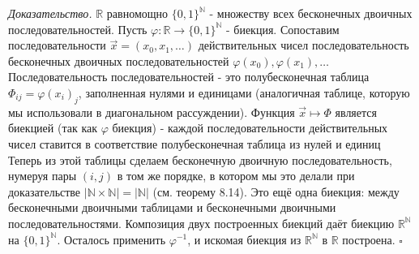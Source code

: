 \documentclass[a4paper]{article}
\newcommand{\qed}{\hfill$\square$}
\begin{document}
\textit{Доказательство.} $\mathbb{R}$ равномощно $\{0,1\}^{\mathbb{N}}$ - множеству всех бесконечных двоичных последовательностей. Пусть $\varphi: \mathbb{R} \rightarrow\{0,1\}^{\mathbb{N}}$ - биекция. Сопоставим последовательности $\vec{x}=\left(x_{0}, x_{1}, \ldots\right)$ действительных чисел последовательность бесконечных двоичных последовательностей $\varphi\left(x_{0}\right), \varphi\left(x_{1}\right), \ldots$\\[2mm]
\indent Последовательность последовательностей - это полубесконечная таблица $\Phi_{i j}=\varphi\left(x_{i}\right)_{j}$, заполненная нулями и единицами (аналогичная таблице, которую мы использовали в диагональном рассуждении). Функция $\vec{x} \mapsto \Phi$ является биекцией (так как $\varphi$ биекция) - каждой последовательности действительных чисел ставится в соответствие полубесконечная таблица из нулей и единиц\\[2mm]
\indent Теперь из этой таблицы сделаем бесконечную двоичную последовательность, нумеруя пары $(i, j)$ в том же порядке, в котором мы это делали при доказательстве $|\mathbb{N} \times \mathbb{N}|=|\mathbb{N}|$ (см. теорему 8.14). Это ещё одна биекция: между бесконечными двоичными таблицами и бесконечными двоичными последовательностями. Композиция двух построенных биекций даёт биекцию $\mathbb{R}^{\mathbb{N}}$ на $\{0,1\}^{\mathbb{N}}$. Осталось применить $\varphi^{-1}$, и искомая биекция из $\mathbb{R}^{\mathbb{N}}$ в $\mathbb{R}$ построена. \qed
\end{document}

